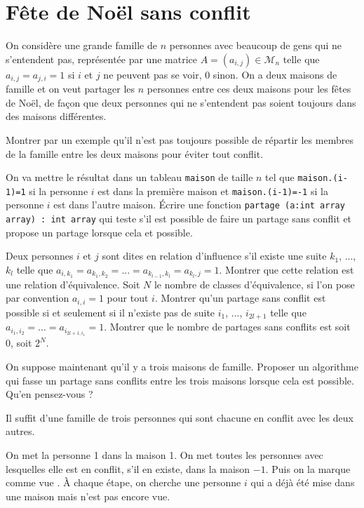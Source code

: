\renewcommand{\SourceFile}{5-graphes/src/5-1.ml}

\section{Fête de Noël sans conflit}

On considère une grande famille de $n$ personnes avec beaucoup de gens qui ne s'entendent pas, représentée par une matrice $A=(a_{i,j})\in \mathscr{M}_n$ telle que $a_{i,j}=a_{j,i}=1$ si $i$ et $j$ ne peuvent pas se voir, 0 sinon. On a deux maisons de famille et on veut partager les $n$ personnes entre ces deux maisons pour les fêtes de Noël, de façon que deux personnes qui ne s'entendent pas soient toujours dans des maisons différentes.

\Q
Montrer par un exemple qu'il n'est pas toujours possible de répartir les membres de la famille entre les deux maisons pour éviter tout conflit.

\Q
On va mettre le résultat dans un tableau \texttt{maison} de taille $n$ tel que \texttt{maison.(i-1)=1} si la personne $i$ est dans la première maison et \texttt{maison.(i-1)=-1} si la personne $i$ est dans l'autre maison. Écrire une fonction \texttt{partage (a:int array array) : int array} qui teste s'il est possible de faire un partage sans conflit et propose un partage lorsque cela et possible.

\Q
Deux personnes $i$ et $j$ sont dites en relation d'influence s'il existe une suite $k_1$, ..., $k_l$ telle que $a_{i,k_1}=a_{k_1,k_2}=...=a_{k_{l-1},k_l}=a_{k_l,j}=1$. Montrer que cette relation est une relation d'équivalence. Soit $N$ le nombre de classes d'équivalence, si l'on pose par convention $a_{i,i}=1$ pour tout $i$. Montrer qu'un partage sans conflit est possible si et seulement si il n'existe pas de suite $i_1$, ..., $i_{2l+1}$ telle que $a_{i_1,i_2}=...=a_{i_{2l+1,i_1}}=1$. Montrer que le nombre de partages sans conflits est soit 0, soit $2^N$.

\Q
On suppose maintenant qu'il y a trois maisons de famille. Proposer un algorithme qui fasse un partage sans conflits entre les trois maisons lorsque cela est possible. Qu'en pensez-vous ?

\Corrige

\Q
Il suffit d'une famille de trois personnes qui sont chacune en conflit avec les deux autres.

\Q
On met la personne 1 dans la maison 1. On met toutes les personnes avec lesquelles elle est en conflit, s'il en existe, dans la maison $-1$. Puis on la marque comme \og vue \fg{}. À chaque étape, on cherche une personne $i$ qui a déjà été mise dans une maison mais n'est pas encore vue.
\medskip

